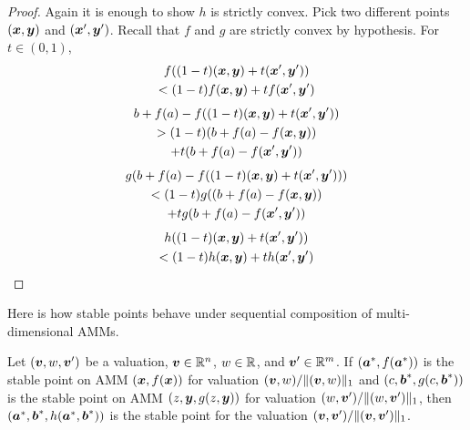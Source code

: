 \begin{proof}
   Again it is enough to show $h$ is strictly convex.
   Pick two different points $(\bx,\by)$ and $(\bx',\by')$.
  Recall that $f$ and $g$ are strictly convex by hypothesis.
  For $t \in (0,1)$,
  \begin{multline*}
      f((1-t)(\bx,\by) + t(\bx',\by'))\\
      < (1-t)f(\bx,\by) + t f(\bx',\by')
  \end{multline*}
  \begin{multline*}
      b+f(a)-f((1-t)(\bx,\by) + t (\bx',\by'))\\
      > (1-t)(b+f(a)-f(\bx,\by))\\ + t(b+f(a)-f(\bx',\by'))
  \end{multline*}
  \begin{multline*}
    g(b+f(a)-f((1-t)(\bx,\by) + t(\bx',\by'))) \\
    < (1-t)g((b+f(a)-f(\bx,\by))\\ + tg(b+f(a)-f(\bx',\by'))
  \end{multline*}
  \begin{multline*}
    h((1-t)(\bx,\by) + t(\bx',\by')) \\
    < (1-t)h(\bx,\by) + t h(\bx',\by')
  \end{multline*}
\end{proof}
Here is how stable points behave under sequential composition of multi-dimensional AMMs.

\begin{theorem}
\sloppy
  Let $(\bv,w,\bv')$ be a valuation, $\bv \in \Reals^n$, 
  $w \in \Reals$, and
  $\bv' \in \Reals^m$.
  If $(\ba^{*},f(\ba^{*}))$ is the stable point on AMM $(\bx,f(\bx))$
  for valuation $(\bv,w) / \|(\bv,w)\|_1$ and
  $(c,\bb^{*},g(c,\bb^{*}))$ is the stable point on AMM $(z,\by,g(z,\by))$
  for  valuation $(w,\bv') / \|(w,\bv')\|_1$,
  then $(\ba^{*},\bb^{*},h(\ba^{*},\bb^{*}))$ is the stable point for the valuation
  $(\bv,\bv') / \|(\bv,\bv')\|_1$.
  \end{theorem}

